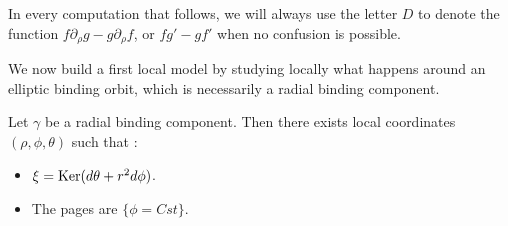 \documentclass[../main.tex]{subfiles}
\begin{document}
\begin{remark}
In every computation that follows, we will always use the letter $D$ to denote the function $f\partial_\rho g - g\partial_\rho f$, or $fg' - gf'$ when no confusion is possible.
\end{remark}

We now build a first local model by studying locally what happens around an elliptic binding orbit, which is necessarily a radial binding component. \\

\begin{lemma}\label{l:radial_coo}
Let $\gamma$ be a radial binding component. Then there exists local coordinates $(\rho,\phi,\theta)$ such that :

\begin{itemize}
    \item $\xi = \text{Ker}(d\theta + r^2d\phi)$.
    \item The pages are $\{\phi = Cst\}$.
\end{itemize}

\end{lemma}
\end{document}
